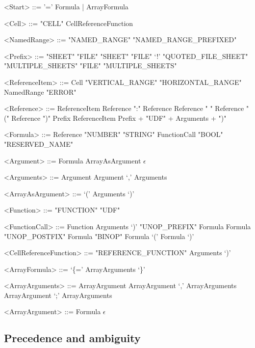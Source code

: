 \documentclass[conference]{IEEEtran}
\begin{document}
\begin{grammar}
<Start> ::= '=' Formula | ArrayFormula


%
%
%
%

<Cell> ::= "CELL"
	  \alt CellReferenceFunction


<NamedRange> ::= "NAMED_RANGE"
            \alt "NAMED_RANGE_PREFIXED"

<Prefix> ::= "SHEET"
	\alt "FILE" "SHEET"
	\alt "FILE" `!'
	\alt "QUOTED_FILE_SHEET"
	\alt "MULTIPLE_SHEETS"
	\alt "FILE" "MULTIPLE_SHEETS"

<ReferenceItem> ::= Cell
	\alt "VERTICAL_RANGE"
	\alt "HORIZONTAL_RANGE"
	\alt NamedRange
	\alt "ERROR" 

<Reference> ::= ReferenceItem
	\alt Reference ":" Reference
	\alt Reference " " Reference
	\alt "(" Reference ")"
	\alt Prefix ReferenceItem
              \alt Prefix + "UDF" + Arguments + ")"
              
<Formula> ::= Reference
         \alt "NUMBER"
         \alt "STRING"
         \alt FunctionCall
         \alt "BOOL"
         \alt "RESERVED_NAME"

<Argument> ::= Formula
\alt ArrayAsArgument
\alt $\epsilon$

<Arguments> ::= Argument
\alt Argument `,' Arguments

<ArrayAsArgument> ::= `(' Arguments `)'

<Function> ::= "FUNCTION"
	\alt "UDF"

<FunctionCall> ::= Function Arguments `)'
\alt "UNOP_PREFIX" Formula
\alt Formula "UNOP_POSTFIX"
\alt Formula "BINOP" Formula
\alt `(' Formula `)'

<CellReferenceFunction> ::= "REFERENCE_FUNCTION" Arguments `)'

<ArrayFormula> ::= `\{=' ArrayArguments `\}' 

<ArrayArguments> ::= ArrayArgument
 \alt ArrayArgument `,' ArrayArguments
 \alt ArrayArgument `;' ArrayArguments
 
<ArrayArgument> ::= Formula
 \alt $\epsilon$


\end{grammar}

\subsection{Precedence and ambiguity}
\end{document}
